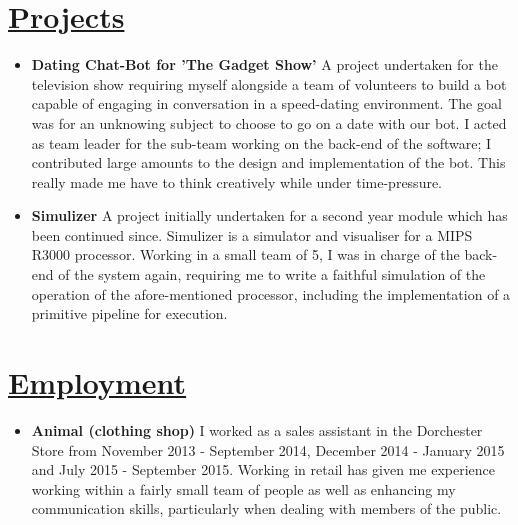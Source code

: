 \documentclass[11pt]{article}
\begin{document}
	\vspace{-20pt}
	\hspace{-100pt}\section*{\underline{Projects}} %
			\begin{itemize}
				\item \textbf{Dating Chat-Bot for 'The Gadget Show'} A project undertaken for the television show requiring myself alongside a team of volunteers to build a bot capable of engaging in conversation in a speed-dating environment. The goal was for an unknowing subject to choose to go on a date with our bot. I acted as team leader for the sub-team working on the back-end of the software; I contributed large amounts to the design and implementation of the bot. This really made me have to think creatively while under time-pressure.
				\item \textbf{Simulizer} A project initially undertaken for a second year module which has been continued since. Simulizer is a simulator and visualiser for a MIPS R3000 processor. Working in a small team of 5, I was in charge of the back-end of the system again, requiring me to write a faithful simulation of the operation of the afore-mentioned processor, including the implementation of a primitive pipeline for execution. 
			\end{itemize}
	\vspace{-20pt}
	\hspace{-100pt}\section*{\underline{Employment}}
			\begin{itemize}
				\item \textbf{Animal (clothing shop) }I worked as a sales assistant in the Dorchester Store from November 2013 - September 2014, December 2014 - January 2015 and July 2015 - September 2015. Working in retail has given me experience working within a fairly small team of people as well as enhancing my communication skills, particularly when dealing with members of the public. 
			\end{itemize}
\end{document}
